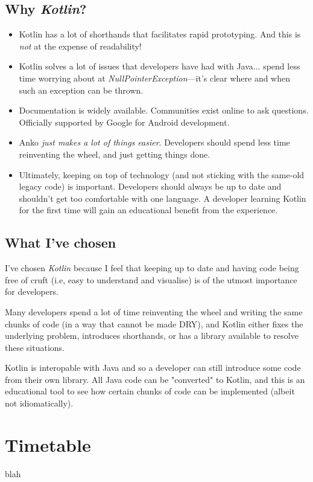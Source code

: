 \documentclass[a4paper]{article}
\begin{document}
\subsection{Why \emph{Kotlin}?}
\begin{itemize}
	\item Kotlin has a lot of shorthands that facilitates rapid prototyping. And this is \emph{not} at the expense of readability!\cite{whykotlin}
	\item Kotlin solves a lot of issues that developers have had with Java... spend less time worrying about at \emph{NullPointerException}---it's clear where and when such an exception can be thrown.
	\item Documentation is widely available. Communities exist online\cite{kotlincommunity} to ask questions. Officially supported by Google for Android development.
	\item Anko \emph{just makes a lot of things easier}. Developers should spend less time reinventing the wheel, and just getting things done.
	\item Ultimately, keeping on top of technology (and not sticking with the same-old legacy code) is important. Developers should always be up to date and shouldn't get too comfortable with one language. A developer learning Kotlin for the first time will gain an educational benefit from the experience.
\end{itemize}

\subsection{What I've chosen}
I've chosen \emph{Kotlin} because I feel that keeping up to date and having code being free of cruft (i.e, easy to understand and visualise) is of the utmost importance for developers.

Many developers spend a lot of time reinventing the wheel and writing the same chunks of code (in a way that cannot be made DRY), and Kotlin either fixes the underlying problem, introduces shorthands, or has a library available to resolve these situations.

Kotlin is interopable with Java and so a developer can still introduce some code from their own library. All Java code can be "converted" to Kotlin, and this is an educational tool to see how certain chunks of code can be implemented (albeit not idiomatically).

\section{Timetable}
blah
\end{document}
